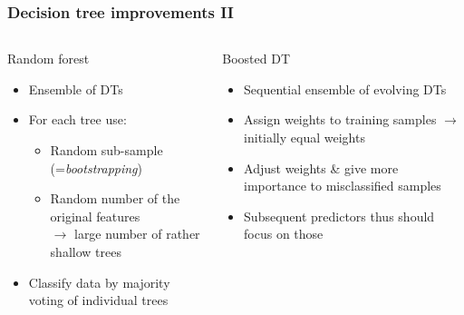\documentclass{beamer}
\begin{document}
\begin{frame}
    \frametitle{Decision tree improvements II}
    \begin{columns}[T] %
        \begin{column}{.48\textwidth}
            \begin{block}{Random forest}
                \begin{itemize}
                    \item<1-> Ensemble of DTs
                    \item<2-> For each tree use:
                    \begin{itemize}
                        \item<3-> Random sub-sample (=\emph{bootstrapping})
                        \item<4-> Random number of the original features\\
                                  $\to$ large number of rather shallow trees
                    \end{itemize}
                    \item<5-> Classify data by majority voting of individual trees
                \end{itemize}
            \end{block}
        \end{column}%
        \hfill%
        \begin{column}{.48\textwidth}
            \begin{block}{Boosted DT}
                \begin{itemize}
                    \item<6-> Sequential ensemble of evolving DTs
                    \item<7-> Assign weights to training samples $\to$ initially equal weights
                    \item<8-> Adjust weights \& give more importance to misclassified samples
                    \item<9-> Subsequent predictors thus should focus on those 
                \end{itemize}
            \end{block}            
        \end{column}%
    \end{columns}

\end{frame}

\end{document}
